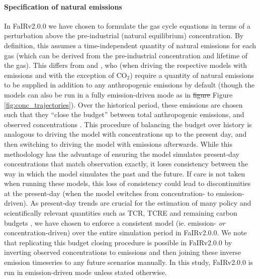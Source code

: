 \documentclass[gmd, manuscript]{copernicus}
\providecommand{\DIFadd}[1]{{\protect\color{blue}#1}} %
\providecommand{\DIFdel}[1]{{\protect\color{red}\sout{#1}}}                      %
\providecommand{\DIFaddbegin}{} %
\providecommand{\DIFaddend}{} %
\providecommand{\DIFdelbegin}{} %
\providecommand{\DIFdelend}{} %
\begin{document}
\paragraph*{Specification of natural emissions}
In FaIRv2.0\DIFaddbegin \DIFadd{.0 }\DIFaddend we have chosen to formulate the gas cycle equations in terms of a perturbation above the pre-industrial (natural equilibrium) concentration. By definition, this assumes a time-independent quantity of natural emissions for each gas (which can be derived from the pre-industrial concentration and lifetime of the gas). This differs from \cite{Meinshausen2011} and \cite{Smith2018}, who (when driving the respective models with emissions and with the exception of CO$_2$) require a quantity of natural emissions to be supplied in addition to any anthropogenic emissions by default (though the models can also be run in a fully emission-driven mode as in \DIFdelbegin \DIFdel{figure }\DIFdelend \DIFaddbegin \DIFadd{Figure }\DIFaddend \ref{fig:conc_trajectories}). Over the historical period, these emissions are chosen such that they ``close the budget'' between total anthropogenic emissions, and observed concentrations \citep{Meinshausen2011,Smith2018}. This procedure of balancing the budget over history is analogous to driving the model with concentrations up to the present day, and then switching to driving the model with emissions afterwards. While this methodology has the advantage of ensuring the model simulates present-day concentrations that match observation exactly, it loses consistency between the way in which the model simulates the past and the future. If care is not taken when running these models, this loss of consistency could lead to discontinuities at the present-day (when the model switches from concentration- to emission-driven). As present-day trends are crucial for the estimation of many policy and scientifically relevant quantities such as TCR, TCRE and remaining carbon budgets \citep{Leach2018,Tokarska2020a,Jimenez-de-la-Cuesta2019}, we have chosen to enforce a consistent model (ie. emission- \emph{or} concentration-driven) over the entire simulation period in FaIRv2.0\DIFaddbegin \DIFadd{.0}\DIFaddend . We note that replicating this budget closing procedure is possible in FaIRv2.0\DIFaddbegin \DIFadd{.0 }\DIFaddend by inverting observed concentrations to emissions and then joining these inverse emission timeseries to any future scenarios manually. In this study, FaIRv2.0\DIFaddbegin \DIFadd{.0 }\DIFaddend is run in emission-driven mode unless stated otherwise.
%
\end{document}
